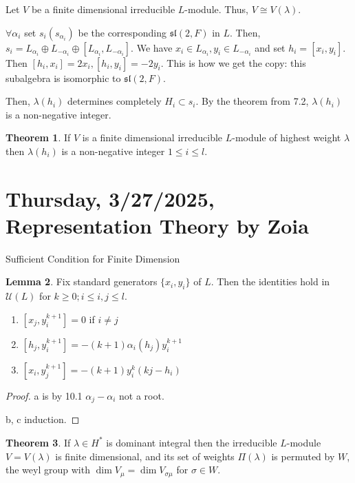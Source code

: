 \documentclass{article}
\theoremstyle{definition}
\newtheorem{theorem}{Theorem}
\newtheorem{lemma}[theorem]{Lemma}
\begin{document}
    Let \(V\) be a finite dimensional irreducible \(L\)-module. Thus, \(V\cong V(\lambda)\).

    \(\forall \alpha_i\) set \(s_i (s_{\alpha_i})\) be the corresponding \(\mathfrak{sl}(2,F)\) in \(L\). Then, \(s_i = L_{\alpha_i} \oplus L_{-\alpha_i} \oplus [L_{\alpha_i}, L_{-\alpha_i}]\). We have \(x_i \in L_{\alpha_i}, y_i \in L_{-\alpha_i}\) and set \(h_i = [x_i, y_i]\). Then \([h_i, x_i] = 2x_i, [h_i, y_i]=-2y_i\). This is how we get the copy: this subalgebra is isomorphic to \(\mathfrak{sl}(2,F)\).
    
    Then, \(\lambda(h_i)\) determines completely \(H_i \subset s_i\). By the theorem from 7.2, \(\lambda(h_i)\) is a non-negative integer.
    
    \begin{theorem}
        If \(V\) is a finite dimensional irreducible \(L\)-module of highest weight \(\lambda\) then \(\lambda(h_i)\) is a non-negative integer \(1 \leq i \leq l\).
    \end{theorem}

    \section{Thursday, 3/27/2025, Representation Theory by Zoia}
    
    Sufficient Condition for Finite Dimension

    \begin{lemma}
        Fix standard generators \(\{ x_i, y_i \} \) of \(L\). Then the identities hold in \(\mathcal{U}(L)\) for \(k \geq 0; i \leq i,j \leq l\).

        \begin{enumerate}[label=\alph*)]
            \item \([x_j, y_i^{k+1}] = 0\) if \(i \neq j\)
            \item \([h_j, y_i^{k+1}] = -(k+1) \alpha_i (h_j) y_i^{k+1}\)
            \item \([x_i, y_j^{k+1}] = -(k+1)y_i^k(kj-h_{i})\)  
        \end{enumerate} 
    \end{lemma}

    \begin{proof}
        a is by 10.1 \(\alpha_j - \alpha_i\) not a root.

        b, c induction.
    \end{proof}

    \begin{theorem}
        If \(\lambda \in H^{\ast}\) is dominant integral then the irreducible \(L\)-module \(V = V(\lambda)\) is finite dimensional, and its set of weights \(\Pi(\lambda)\) is permuted by \(W\), the weyl group with \(\dim V_\mu = \dim V_{\sigma \mu}\) for \(\sigma \in W\).
    \end{theorem}
\end{document}
